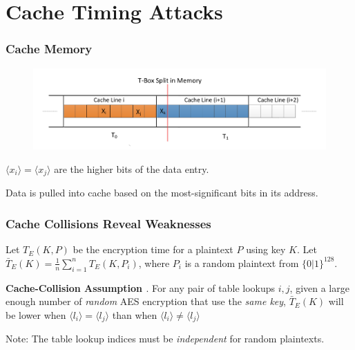\documentclass[9pt,handout]{beamer}
\begin{document}
\section{Cache Timing Attacks}
\begin{frame}
	\frametitle{Cache Memory}
\begin{figure}
\centering
\includegraphics[scale = 0.35]{images/aesCacheLines.pdf}
\end{figure}
$\langle x_i \rangle = \langle x_j \rangle$ are the higher bits of the data entry.

\medskip

Data is pulled into cache based on the most-significant bits in its address.
\end{frame}

\begin{frame}
	\frametitle{Cache Collisions Reveal Weaknesses}
	Let $T_E(K, P)$ be the encryption time for a plaintext $P$ using key $K$. 
	Let $\bar{T}_E(K) = \frac{1}{n}\sum_{i = 1}^{n}T_E(K, P_i)$, where $P_i$ is a random plaintext from $\{0|1\}^{128}$.

	\bigskip

	\textbf{Cache-Collision Assumption \cite{bonneau}}. For any pair of table lookups $i, j$, given
a large enough number of \emph{random} AES encryption that use the \emph{same key}, $\bar{T}_E(K)$ will
be lower when $\langle l_i \rangle = \langle l_j \rangle$ than when $\langle l_i \rangle \not= \langle l_j \rangle$

	\bigskip
	
	Note: The table lookup indices must be \emph{independent} for random plaintexts.
\end{frame}
\end{document}
